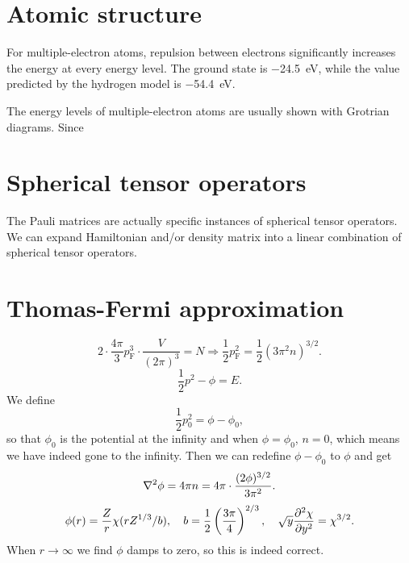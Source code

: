 \documentclass[hyperref, a4paper]{article}
\begin{document}
\section{Atomic structure}

For multiple-electron atoms, 
repulsion between electrons significantly increases 
the energy at every energy level.
The ground state is \SI{-24.5}{eV},
while the value predicted by the 
hydrogen model is \SI{-54.4}{eV}.

The energy levels of multiple-electron atoms 
are usually shown with Grotrian diagrams.
Since 

\section{Spherical tensor operators}

The Pauli matrices are actually specific instances of 
spherical tensor operators.
We can expand Hamiltonian and/or density matrix 
into a linear combination of spherical tensor operators.

\section{Thomas-Fermi approximation}

\begin{equation}
    2 \cdot \frac{4 \pi}{3} p_{\text{F}}^3 \cdot \frac{V}{(2\pi)^3} = N \Rightarrow 
    \frac{1}{2} p_{\text{F}}^2 = \frac{1}{2} (3 \pi^2 n)^{3/2}.
\end{equation}
\begin{equation}
    \frac{1}{2} p^2 - \phi = E.
\end{equation}
We define 
\begin{equation}
    \frac{1}{2} p_0^2 = \phi - \phi_0,
\end{equation}
so that $\phi_0$ is the potential at the infinity 
and when $\phi = \phi_0$, $n = 0$,
which means we have indeed gone to the infinity.
Then we can redefine $\phi - \phi_0$ to $\phi$ and get
\begin{equation}
    \laplacian \phi = 4\pi n = 4\pi \cdot \frac{(2\phi)^{3/2}}{3 \pi^2}.
\end{equation}
\begin{equation}
    \phi(r) = \frac{Z}{r} \chi(r Z^{1/3} / b), \quad 
    b = \frac{1}{2} \left(\frac{3 \pi}{4}\right)^{2/3}, \quad 
    \sqrt{y} \pdv[2]{\chi}{y} = \chi^{3/2}.
\end{equation}
When $r \to \infty$ we find $\phi$ damps to zero, 
so this is indeed correct.
\end{document}
